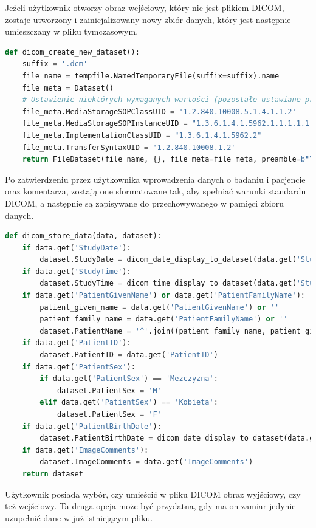 \documentclass[a4paper]{article}
\begin{document}
Jeżeli użytkownik otworzy obraz wejściowy, który nie jest plikiem DICOM, zostaje utworzony i zainicjalizowany nowy zbiór danych, który jest następnie umieszczany w pliku tymczasowym.
\begin{lstlisting}[language=Python, caption=Tworzenie nowego pliku DICOM, texcl=true]
def dicom_create_new_dataset():
    suffix = '.dcm'
    file_name = tempfile.NamedTemporaryFile(suffix=suffix).name
    file_meta = Dataset()
    # Ustawienie niektórych wymaganych wartości (pozostałe ustawiane przy zapisie)
    file_meta.MediaStorageSOPClassUID = '1.2.840.10008.5.1.4.1.1.2'
    file_meta.MediaStorageSOPInstanceUID = "1.3.6.1.4.1.5962.1.1.1.1.1.20040119072730.12322"
    file_meta.ImplementationClassUID = "1.3.6.1.4.1.5962.2"
    file_meta.TransferSyntaxUID = '1.2.840.10008.1.2'
    return FileDataset(file_name, {}, file_meta=file_meta, preamble=b"\0" * 128)
\end{lstlisting}
Po zatwierdzeniu przez użytkownika wprowadzenia danych o badaniu i pacjencie oraz komentarza, zostają one sformatowane tak, aby spełniać warunki standardu DICOM, a następnie są zapisywane do przechowywanego w pamięci zbioru danych.
\begin{lstlisting}[language=Python, caption=Wpisywanie danych do zbioru danych DICOM]
def dicom_store_data(data, dataset):
    if data.get('StudyDate'):
        dataset.StudyDate = dicom_date_display_to_dataset(data.get('StudyDate'))
    if data.get('StudyTime'):
        dataset.StudyTime = dicom_time_display_to_dataset(data.get('StudyTime'))
    if data.get('PatientGivenName') or data.get('PatientFamilyName'):
        patient_given_name = data.get('PatientGivenName') or ''
        patient_family_name = data.get('PatientFamilyName') or ''
        dataset.PatientName = '^'.join((patient_family_name, patient_given_name))
    if data.get('PatientID'):
        dataset.PatientID = data.get('PatientID')
    if data.get('PatientSex'):
        if data.get('PatientSex') == 'Mezczyzna':
            dataset.PatientSex = 'M'
        elif data.get('PatientSex') == 'Kobieta':
            dataset.PatientSex = 'F'
    if data.get('PatientBirthDate'):
        dataset.PatientBirthDate = dicom_date_display_to_dataset(data.get('PatientBirthDate'))
    if data.get('ImageComments'):
        dataset.ImageComments = data.get('ImageComments')
    return dataset
\end{lstlisting}
\pagebreak
Użytkownik posiada wybór, czy umieścić w pliku DICOM obraz wyjściowy, czy też wejściowy. Ta druga opcja może być przydatna, gdy ma on zamiar jedynie uzupełnić dane w już istniejącym pliku.
\end{document}
